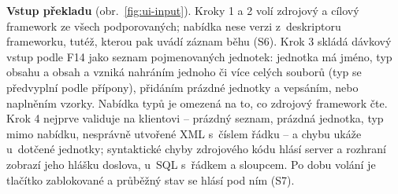 \documentclass{article}
\begin{document}
\textbf{Vstup překladu} (obr.~\ref{fig:ui-input}). Kroky 1 a 2 volí zdrojový a cílový framework ze všech podporovaných; nabídka nese verzi z~deskriptoru frameworku, tutéž, kterou pak uvádí záznam běhu (S6). Krok 3 skládá dávkový vstup podle F14 jako seznam pojmenovaných jednotek: jednotka má jméno, typ obsahu a obsah a vzniká nahráním jednoho či více celých souborů (typ se předvyplní podle přípony), přidáním prázdné jednotky a vepsáním, nebo naplněním vzorky. Nabídka typů je omezená na to, co zdrojový framework čte. Krok 4 nejprve validuje na klientovi -- prázdný seznam, prázdná jednotka, typ mimo nabídku, nesprávně utvořené XML s~číslem řádku -- a chybu ukáže u~dotčené jednotky; syntaktické chyby zdrojového kódu hlásí server a rozhraní zobrazí jeho hlášku doslova, u~SQL s~řádkem a sloupcem. Po dobu volání je tlačítko zablokované a průběžný stav se hlásí pod ním (S7).
\end{document}
